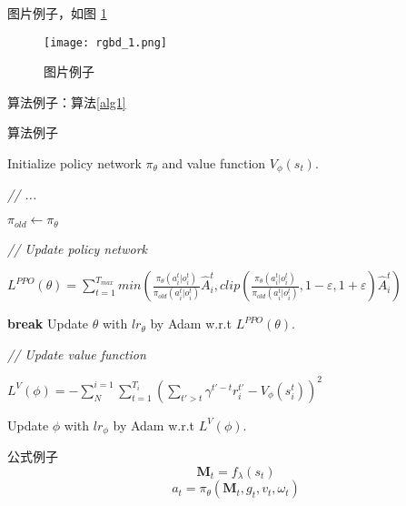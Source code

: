 \documentclass[cs4size,openany,oneside,UTF8,nofonts]{ctexbook}
\begin{document}

图片例子，如图 \ref{图片例子}
\begin{figure}[htbp]
  \centering
  \texttt{[image: rgbd\_1.png]}
  \caption{图片例子}\label{图片例子}
  \vspace{-1em}
\end{figure}

算法例子：算法\ref{alg1}
\begin{algorithm}
  \caption{算法例子}
  \label{alg1}
  Initialize policy network $\pi_\theta$ and value function $V_\phi (s_t)$.

  {
          \textit{// ...}

          $\pi_{old} \leftarrow \pi_{\theta}$

          \textit{// Update policy network}
          
          {
                  $L^{PPO}(\theta) = \sum_{t=1}^{T_{max}}{min(\frac{\pi_{\theta}(a_{i}^{t}|o_{i}^{t})}
                  {\pi_{old}(a_{i}^{t}|o_{i}^{t})}\hat{A}_{i}^{t}, 
                  clip(\frac{\pi_{\theta}(a_{i}^{t}|o_{i}^{t})}{\pi_{old}(a_{i}^{t}|o_{i}^{t})},1-\varepsilon ,1+\varepsilon )
                  \hat{A}_{i}^{t})}$

                  {
                          \textbf{break}
                  }
                  Update $\theta$ with $lr_{\theta}$ by Adam w.r.t $L^{PPO}(\theta)$.
          }

          \textit{// Update value function}

          {
                  $L^{V}(\phi) = -\sum_{N}^{i=1}\sum_{t=1}^{T_i}(\sum_{t'>t}\gamma ^{t'-t}r_{i}^{t'} - V_{\phi}(s_i^t))^2$

                  Update $\phi$ with $lr_{\phi}$ by Adam w.r.t $L^{V}(\phi)$.
          }

  }
\end{algorithm}

公式例子
\begin{equation}
  \textbf{M}_t = f_{\lambda}(s_t)
\end{equation}
\begin{equation}
  a_{t} = \pi_{\theta}(\textbf{M}_t, g_t, v_t, {\omega}_t)
\end{equation}
\end{document}
